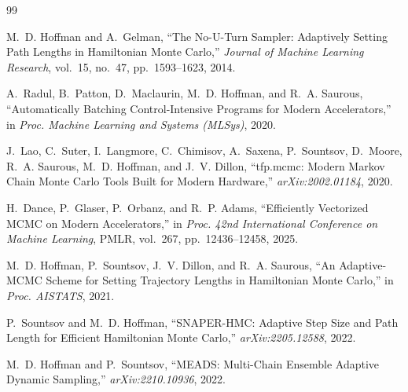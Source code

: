 \documentclass[conference]{IEEEtran}
\begin{document}
\begin{thebibliography}{99}

M.~D. Hoffman and A.~Gelman, ``The No-U-Turn Sampler: Adaptively Setting Path
Lengths in Hamiltonian Monte Carlo,'' \emph{Journal of Machine Learning
Research}, vol.~15, no.~47, pp.~1593--1623, 2014.

A.~Radul, B.~Patton, D.~Maclaurin, M.~D. Hoffman, and R.~A. Saurous,
``Automatically Batching Control-Intensive Programs for Modern Accelerators,''
in \emph{Proc. Machine Learning and Systems (MLSys)}, 2020.

J.~Lao, C.~Suter, I.~Langmore, C.~Chimisov, A.~Saxena, P.~Sountsov, D.~Moore,
R.~A. Saurous, M.~D. Hoffman, and J.~V. Dillon, ``tfp.mcmc: Modern Markov Chain
Monte Carlo Tools Built for Modern Hardware,'' \emph{arXiv:2002.01184}, 2020.

H.~Dance, P.~Glaser, P.~Orbanz, and R.~P. Adams, ``Efficiently Vectorized MCMC
on Modern Accelerators,'' in \emph{Proc. 42nd International Conference on
Machine Learning}, PMLR, vol.~267, pp.~12436--12458, 2025.

M.~D. Hoffman, P.~Sountsov, J.~V. Dillon, and R.~A. Saurous, ``An Adaptive-MCMC
Scheme for Setting Trajectory Lengths in Hamiltonian Monte Carlo,'' in
\emph{Proc. AISTATS}, 2021.

P.~Sountsov and M.~D. Hoffman, ``SNAPER-HMC: Adaptive Step Size and Path Length
for Efficient Hamiltonian Monte Carlo,'' \emph{arXiv:2205.12588}, 2022.

M.~D. Hoffman and P.~Sountsov, ``MEADS: Multi-Chain Ensemble Adaptive Dynamic
Sampling,'' \emph{arXiv:2210.10936}, 2022.

\end{thebibliography}
\end{document}
